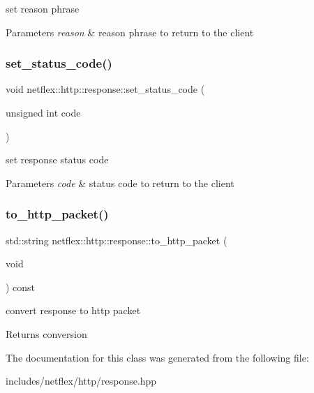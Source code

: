 set reason phrase


\begin{DoxyParams}{Parameters}
{\em reason} & reason phrase to return to the client \\
\hline
\end{DoxyParams}
\mbox{\label{classnetflex_1_1http_1_1response_a8aead942bd679932d47047cf0cd9298e}} 
\subsubsection{\texorpdfstring{set\+\_\+status\+\_\+code()}{set\_status\_code()}}
{\footnotesize\ttfamily void netflex\+::http\+::response\+::set\+\_\+status\+\_\+code (\begin{DoxyParamCaption}\item[{unsigned int}]{code }\end{DoxyParamCaption})}

set response status code


\begin{DoxyParams}{Parameters}
{\em code} & status code to return to the client \\
\hline
\end{DoxyParams}
\mbox{\label{classnetflex_1_1http_1_1response_a5e6e4e483bee30dacbe6b6685201ddd0}} 
\subsubsection{\texorpdfstring{to\+\_\+http\+\_\+packet()}{to\_http\_packet()}}
{\footnotesize\ttfamily std\+::string netflex\+::http\+::response\+::to\+\_\+http\+\_\+packet (\begin{DoxyParamCaption}\item[{void}]{ }\end{DoxyParamCaption}) const}

convert response to http packet

\begin{DoxyReturn}{Returns}
conversion 
\end{DoxyReturn}


The documentation for this class was generated from the following file\+:\begin{DoxyCompactItemize}
\item 
includes/netflex/http/response.\+hpp\end{DoxyCompactItemize}
